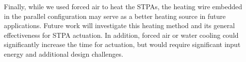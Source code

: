 \documentclass[twocolumn,10pt]{asme2e}
\begin{document}





Finally, while we used forced air to heat the STPAs, the heating wire embedded in the parallel configuration may serve as a better heating source in future applications. %
Future work will investigate this heating method and its general effectiveness for STPA actuation. In addition, forced air or water cooling could significantly increase the time for actuation, but would require significant input energy and additional design challenges.

%	
%	
%	
%
\end{document}
